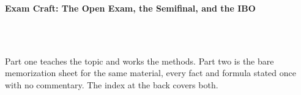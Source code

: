 



\makeindex[title={Index of This Volume},columns=2,intoc]

\begin{titlepage}\thispagestyle{empty}
\vspace*{0.14\textheight}
\noindent{\color{tiercore}\rule{\textwidth}{5pt}}\\[3pt]
\noindent{\color{bioline}\rule{\textwidth}{1pt}}\\[26pt]
\\[12pt]
\noindent\begin{minipage}{\textwidth}\raggedright
{\sffamily\bfseries\fontsize{28}{32}\selectfont\color{bioink}%
 \hyphenchar{} Exam Craft: The Open Exam, the Semifinal, and the IBO\par}\end{minipage}\\[16pt]
\noindent{\color{biogreen}\rule{\textwidth}{1.4pt}}\\[10pt]
\noindent\begin{minipage}{\textwidth}\raggedright
{\fontsize{10.5}{14}\selectfont\color{biogreen}%
Part one teaches the topic and works the methods. Part two is the bare memorization sheet for the
same material, every fact and formula stated once with no commentary. The index at the back covers both.\par}\end{minipage}
\vfill
\noindent{\color{bioline}\rule{\textwidth}{1pt}}\\[3pt]
\noindent{\color{tiercore}\rule{\textwidth}{5pt}}
\end{titlepage}
\tableofcontents
\clearpage
{}
\clearpage
\printindex

